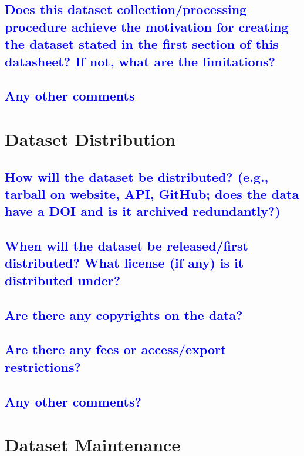 \documentclass[letterpaper, 10 pt, conference]{ieeeconf}  %
\begin{document}
\textcolor{blue}{\subsection{Does this dataset collection/processing procedure
achieve the motivation for creating the dataset
stated in the first section of this datasheet? If not,
what are the limitations?}}
\lipsum[1]


\textcolor{blue}{\subsection{Any other comments}}
\lipsum[1]

\section{Dataset Distribution}

\textcolor{blue}{\subsection{How will the dataset be distributed? (e.g., tarball on
website, API, GitHub; does the data have a DOI and is it
archived redundantly?)}}
\lipsum[1][1-10]


\textcolor{blue}{\subsection{When will the dataset be released/first distributed?
What license (if any) is it distributed under?}}
\lipsum[1]

\textcolor{blue}{\subsection{Are there any copyrights on the data?}}
\lipsum[1]


\textcolor{blue}{\subsection{Are there any fees or access/export restrictions?}}
\lipsum[1]

\textcolor{blue}{\subsection{Any other comments?}}
\lipsum[1]

\section{Dataset Maintenance}
\end{document}
